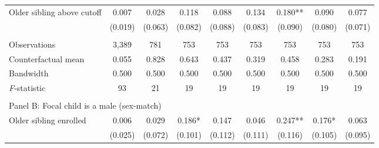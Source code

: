 \begin{table}[!htbp]
{{\begin{tabular}{lcccccccc}
Older sibling above cutoff&       0.007   &       0.028   &       0.118   &       0.088   &       0.134   &       0.180** &       0.090   &       0.077   \\
                    &     (0.019)   &     (0.063)   &     (0.082)   &     (0.088)   &     (0.083)   &     (0.090)   &     (0.080)   &     (0.071)   \\
                    &               &               &               &               &               &               &               &               \\
Observations        &       3,389   &         781   &         753   &         753   &         753   &         753   &         753   &         753   \\
Counterfactual mean &       0.055   &       0.828   &       0.643   &       0.437   &       0.319   &       0.458   &       0.283   &       0.191   \\
Bandwidth           &       0.500   &       0.500   &       0.500   &       0.500   &       0.500   &       0.500   &       0.500   &       0.500   \\
\textit{F}-statistic&          93   &          21   &          19   &          19   &          19   &          19   &          19   &          19   \\
 
&  &  &  &  \\
\multicolumn{10}{l}{Panel B: Focal child is a male (sex-match)} \\
Older sibling enrolled&       0.006   &       0.029   &       0.186*  &       0.147   &       0.046   &       0.247** &       0.176*  &       0.063   \\
                    &     (0.025)   &     (0.072)   &     (0.101)   &     (0.112)   &     (0.111)   &     (0.116)   &     (0.105)   &     (0.095)   \\
 

\end{tabular}}}
\end{table}
